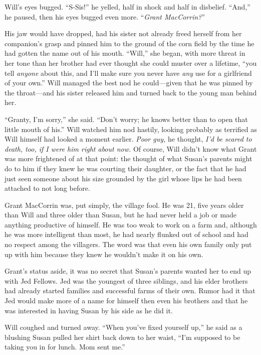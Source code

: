 \documentclass[12pt,letterpaper,oneside,english]{book}
\begin{document}
Will's eyes bugged. ``S-Sis!'' he yelled, half in shock and half in
disbelief. ``And,'' he paused, then his eyes bugged even more.
``\emph{Grant MacCorrin?}''

His jaw would have dropped, had his sister not already freed herself
from her companion's grasp and pinned him to the ground of the corn
field by the time he had gotten the name out of his mouth. ``Will,'' she
began, with more threat in her tone than her brother had ever thought
she could muster over a lifetime, ``you tell \emph{anyone} about this,
and I'll make sure you never have \emph{any} use for a girlfriend of
your own.'' Will managed the best nod he could---given that he was
pinned by the throat---and his sister released him and turned back to
the young man behind her. 

``Granty, I'm sorry,'' she said. ``Don't worry; he knows better than to
open that little mouth of his.'' Will watched him nod hastily, looking
probably as terrified as Will himself had looked a moment earlier.
\textit{Poor guy,} he thought, \textit{I'd be scared to death, too, if I
were him right about now.} Of course, Will didn't know what Grant was
more frightened of at that point: the thought of what Susan's parents
might do to him if they knew he was courting their daughter, or the fact
that he had just seen someone about his size grounded by the girl whose
lips he had been attached to not long before.

Grant MacCorrin was, put simply, the village fool. He was 21, five years
older than Will and three older than Susan, but he had never held a job or
made anything productive of himself. He was too weak to work on a farm
and, although he was more intelligent than most, he had nearly flunked out
of school and had no respect among the villagers. The word was that even
his own family only put up with him because they knew he wouldn't make it
on his own.

Grant's status aside, it was no secret that Susan's parents wanted her
to end up with Jed Fellows. Jed was the youngest of three siblings, and
his elder brothers had already started families and successful farms of
their own. Rumor had it that Jed would make more of a name for himself
then even his brothers and that he was interested in having Susan by his
side as he did it. 

Will coughed and turned away. ``When you've fixed yourself up,'' he said
as a blushing Susan pulled her shirt back down to her waist, ``I'm
supposed to be taking you in for lunch. Mom sent me.''
\end{document}
